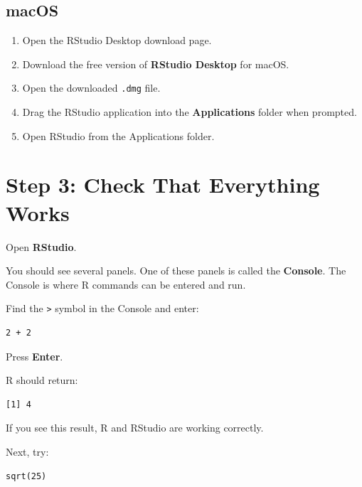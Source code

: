 \documentclass[11pt]{article}
\begin{document}

\subsection{macOS}

\begin{enumerate}
    \item Open the RStudio Desktop download page.
    \item Download the free version of \textbf{RStudio Desktop} for macOS.
    \item Open the downloaded \texttt{.dmg} file.
    \item Drag the RStudio application into the \textbf{Applications} folder when prompted.
    \item Open RStudio from the Applications folder.
\end{enumerate}


\newpage 

\section{Step 3: Check That Everything Works}

Open \textbf{RStudio}.

You should see several panels. One of these panels is called the \textbf{Console}. The Console is where R commands can be entered and run.

Find the \texttt{>} symbol in the Console and enter:

\begin{lstlisting}
2 + 2
\end{lstlisting}

Press \textbf{Enter}.

R should return:

\begin{lstlisting}
[1] 4
\end{lstlisting}

If you see this result, R and RStudio are working correctly.

Next, try:

\begin{lstlisting}
sqrt(25)
\end{lstlisting}
\end{document}

